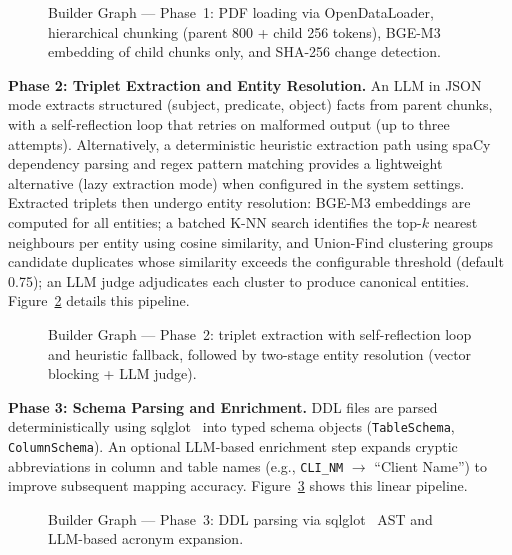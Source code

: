 \begin{figure}[htbp]
\centering
{}
\caption{Builder Graph --- Phase~1: PDF loading via OpenDataLoader, hierarchical chunking (parent 800 + child 256 tokens), BGE-M3 embedding of child chunks only, and SHA-256 change detection.}
\label{fig:sd:builder_p1}
\end{figure}

\textbf{Phase 2: Triplet Extraction and Entity Resolution.} An LLM in JSON mode extracts structured (subject, predicate, object) facts from parent chunks, with a self-reflection loop that retries on malformed output (up to three attempts). Alternatively, a deterministic heuristic extraction path using spaCy~\cite{honnibal2020spacy} dependency parsing and regex pattern matching provides a lightweight alternative (lazy extraction mode) when configured in the system settings. Extracted triplets then undergo entity resolution: BGE-M3 embeddings are computed for all entities; a batched K-NN search identifies the top-$k$ nearest neighbours per entity using cosine similarity, and Union-Find clustering groups candidate duplicates whose similarity exceeds the configurable threshold (default 0.75); an LLM judge adjudicates each cluster to produce canonical entities. Figure~\ref{fig:sd:builder_p2} details this pipeline.

\begin{figure}[htbp]
\centering
{}
\caption{Builder Graph --- Phase~2: triplet extraction with self-reflection loop and heuristic fallback, followed by two-stage entity resolution (vector blocking + LLM judge).}
\label{fig:sd:builder_p2}
\end{figure}

\textbf{Phase 3: Schema Parsing and Enrichment.} DDL files are parsed deterministically using sqlglot~\cite{sqlglot} into typed schema objects (\texttt{TableSchema}, \texttt{ColumnSchema}). An optional LLM-based enrichment step expands cryptic abbreviations in column and table names (e.g., \texttt{CLI\_NM} $\rightarrow$ ``Client Name'') to improve subsequent mapping accuracy. Figure~\ref{fig:sd:builder_p3} shows this linear pipeline.

\begin{figure}[htbp]
\centering
{}
\caption{Builder Graph --- Phase~3: DDL parsing via sqlglot~\cite{sqlglot} AST and LLM-based acronym expansion.}
\label{fig:sd:builder_p3}
\end{figure}

